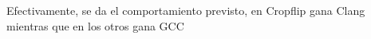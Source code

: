 \begin{figure}[H]
    \centering
    \begin{floatrow}
    \end{floatrow}
\end{figure}

Efectivamente, se da el comportamiento previsto, en Cropflip gana Clang mientras que en los otros gana GCC
